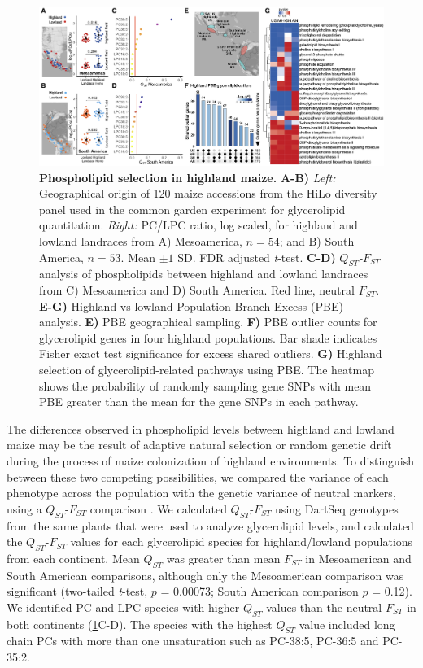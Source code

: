 \documentclass[9pt,twocolumn,twoside,lineno]{biorxiv}
\begin{document}
\begin{figure}[htp]
\centering
\includegraphics[width=0.8\paperwidth]{Figures/Fig_1.png}
\caption{\textbf{Phospholipid selection in highland maize.} 
\textbf{A-B)} \textit{Left:} Geographical origin of 120 maize accessions from the HiLo diversity panel used in the common garden experiment for glycerolipid quantitation.
\textit{Right:} PC/LPC ratio, log scaled, for highland and lowland landraces from A) Mesoamerica, $n=54$; and B) South America, $n=53$.
Mean $\pm 1$ SD. FDR adjusted \textit{t}-test. \textbf{C-D)}
\textit{$Q_{ST}$-$F_{ST}$} analysis of phospholipids between highland and lowland landraces from C) Mesoamerica  and D) South America. 
Red line, neutral $F_{ST}$.
\textbf{E-G)} Highland vs lowland Population Branch Excess (PBE) analysis.
\textbf{E)} PBE geographical sampling.
\textbf{F)} PBE outlier counts for glycerolipid genes in four highland populations.
Bar shade indicates Fisher exact test significance for excess shared outliers. 
\textbf{G)} Highland selection of glycerolipid-related pathways using PBE. The heatmap shows the probability of randomly sampling gene SNPs with mean PBE greater than the mean for the gene SNPs in each pathway.}
\label{Fig1}
\end{figure}

The differences observed in phospholipid levels between highland and lowland maize may be the result of adaptive natural selection or random genetic drift during the process of maize colonization of highland environments.
To distinguish between these two competing possibilities, we compared the variance of each phenotype across the population with the genetic variance of neutral markers, using a $Q_{ST}$-$F_{ST}$ comparison \cite{Leinonen2013-ic}.
We calculated $Q_{ST}$-$F_{ST}$ using DartSeq genotypes \cite{Janzen2021-lz} from the same plants that were used to analyze glycerolipid levels, and calculated the $Q_{ST}$-$F_{ST}$ values for each glycerolipid species for highland/lowland populations from each continent. 
Mean $Q_{ST}$ was greater than mean $F_{ST}$ in Mesoamerican and South American comparisons, although only the Mesoamerican comparison was significant (two-tailed \textit{t}-test, $p$ = 0.00073; South American comparison $p$ = 0.12).
We identified PC and LPC species with higher $Q_{ST}$ values than the neutral $F_{ST}$ in both continents  (\cref{Fig1}C-D).
The species with the highest $Q_{ST}$ value included long chain PCs with more than one unsaturation such as PC-38:5, PC-36:5 and PC-35:2.
\end{document}
